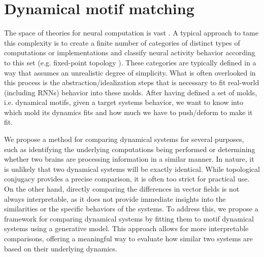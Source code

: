 \documentclass{article}
\theoremstyle{definition} \newtheorem{definition}{Definition}  \newtheorem{example}{Example}
\theoremstyle{remark} \newtheorem{remark}{Remark}
\newcounter{ct}
\begin{document}
\section{Dynamical motif matching}\label{sec:dmm}
The space of theories for neural computation is vast \citep{koulakov2002robust}.
A typical approach to tame this complexity is to create a finite number of categories of distinct types of computations or implementations and classify neural activity behavior according to this set (e.g. fixed-point topology \citep{sussillo2013blackbox}).
These categories are typically defined in a way that assumes an unrealistic degree of simplicity.
What is often overlooked in this process is the abstraction/idealization steps that is necessary to fit real-world (including RNNs) behavior into these molds.
After having defined a set of molds, i.e. dynamical motifs, given a target systems behavior, we want to know into which mold its dynamics fits and how much we have to push/deform to make it fit.

We propose a method for comparing dynamical systems for several purposes, such as identifying the underlying computations being performed or determining whether two brains are processing information in a similar manner. In nature, it is unlikely that two dynamical systems will be exactly identical.
While topological conjugacy provides a precise comparison, it is often too strict for practical use.
On the other hand, directly comparing the differences in vector fields is not always interpretable, as it does not provide immediate insights into the similarities or the specific behaviors of the systems.
To address this, we propose a framework for comparing dynamical systems by fitting them to motif dynamical systems using a generative model.
This approach allows for more interpretable comparisons, offering a meaningful way to evaluate how similar two systems are based on their underlying dynamics.
\end{document}
